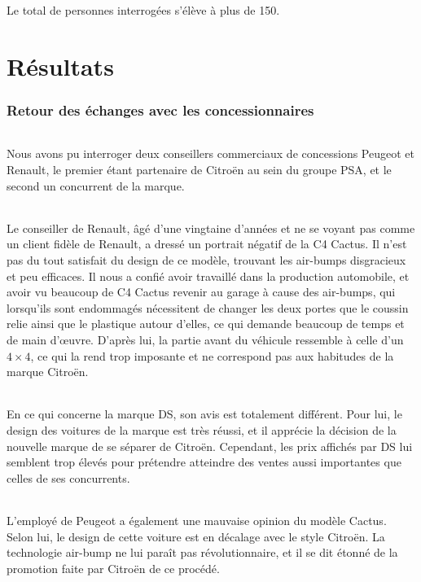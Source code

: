 \documentclass[12pt]{article}\usepackage[]{graphicx}\usepackage[]{color}
\begin{document}
\noindent Le total de personnes interrogées s'élève à plus de 150.

\part{Résultats}

\section{Retour des échanges avec les concessionnaires}

\paragraph{} Nous avons pu interroger deux conseillers commerciaux de
concessions Peugeot et Renault, le premier étant partenaire de Citroën au
sein du groupe PSA, et le second un concurrent de la marque.

\paragraph{} Le conseiller de Renault, âgé d'une vingtaine d'années et ne se voyant
pas comme un client fidèle de Renault, a dressé un portrait négatif de la
C4 Cactus. Il n'est pas du tout satisfait du design de ce modèle, trouvant les
air-bumps disgracieux et peu efficaces.
Il nous a confié avoir travaillé dans la production automobile, et avoir vu
beaucoup de C4 Cactus revenir au garage à cause des air-bumps, qui lorsqu'ils
sont endommagés nécessitent de changer les deux portes que le coussin relie
ainsi que le plastique autour d'elles, ce qui demande beaucoup de temps et de main d'œuvre.
D'après lui, la partie avant du véhicule ressemble à celle d'un $4 \times 4$,
ce qui la rend trop imposante et ne correspond pas aux habitudes de la marque Citroën.

\paragraph{} En ce qui concerne la marque DS, son avis est totalement
différent. Pour lui, le design des voitures de la marque est très réussi,
et il apprécie la décision de la nouvelle marque de se séparer de
Citroën. Cependant, les prix affichés par DS lui semblent trop élevés pour prétendre
atteindre des ventes aussi importantes que celles de ses concurrents.

\paragraph{} L'employé de Peugeot a également une mauvaise opinion du modèle Cactus.
Selon lui, le design de cette voiture est en décalage avec le style Citroën. La
technologie air-bump ne lui paraît pas révolutionnaire, et il se dit étonné
de la promotion faite par Citroën de ce procédé.
\end{document}

